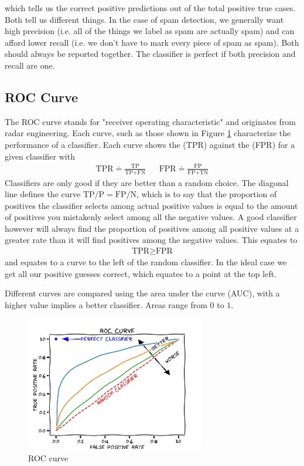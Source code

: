 which tells us the correct positive predictions out of the total positive true cases. Both tell us different things. In the case of spam detection, we generally want high precision (i.e. all of the things we label as spam are actually spam) and can afford lower recall (i.e. we don't have to mark every piece of spam as spam). Both should always be reported together. The classifier is perfect if both precision and recall are one.

\subsection{ROC Curve}
The ROC curve stands for "receiver operating characteristic" and originates from radar engineering. Each curve, such as those shown in Figure \ref{fig:roc-curve} characterize the performance of a classifier. Each curve shows the  (TPR) against the  (FPR) for a given classifier with
\begin{align}
    \textrm{TPR} \doteq \frac{\textrm{TP}}{\textrm{TP+FN}} && \textrm{FPR} \doteq \frac{\textrm{FP}}{\textrm{FP+TN}}
\end{align}
Classifiers are only good if they are better than a random choice. The diagonal line defines the curve $\textrm{TP}/\textrm{P} = \textrm{FP} /\textrm{N}$, which is to say that the proportion of positives the classifier selects among actual positive values is equal to the amount of positives you mistakenly select among all the negative values. A good classifier however will always find the proportion of positives among all positive values at a greater rate than it will find positives among the negative values. This equates to 
\begin{align}
        \textrm{TPR} \geq \textrm{FPR}
\end{align}
and equates to a curve to the left of the random classifier. In the ideal case
we get all our positive guesses correct, which equates to a point at the top left.

Different curves are compared using the area under the curve (AUC), with a higher value implies a better classifier. Areas range from $0$ to $1$.

\begin{figure}
\centerline{\includegraphics[width=0.7\textwidth]{mathematics/fig/rocCurve.png}}
\label{fig:roc-curve}
\caption{ROC curve}
\end{figure}

